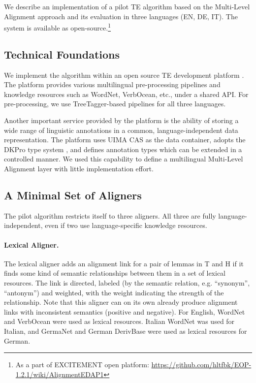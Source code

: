 \documentclass[11pt,letterpaper]{article}
\begin{document}
We describe an implementation of a pilot TE algorithm based on the
Multi-Level Alignment approach and its evaluation in three languages
(EN, DE, IT). The system is available as
open-source.\footnote{As a part of EXCITEMENT open platform: \url{https://github.com/hltfbk/EOP-1.2.1/wiki/AlignmentEDAP1}}


\subsection{Technical Foundations}  
\label{sec:techn-found}

We implement the algorithm within an open source TE development
platform \cite{EOP-arch}. The platform provides various multilingual
pre-processing pipelines and knowledge resources such as WordNet,
VerbOcean, etc., under a shared API. For pre-processing, we use
TreeTagger-based pipelines for all three languages.

Another important service provided by the platform is the
ability of storing a wide range of linguistic annotations in a common,
language-independent data representation. The platform uses UIMA CAS
\cite{d04:_uima} as the data container, adopts the DKPro type system
\cite{DKpro}, and defines annotation types which can be extended in a
controlled manner. We used this capability to define a multilingual
Multi-Level Alignment layer  %
with little implementation effort.

\subsection{A Minimal Set of Aligners}

The pilot algorithm restricts itself to three aligners.  All three are
fully language-independent, even if two use
language-specific knowledge resources.

\paragraph{Lexical Aligner.} The lexical aligner adds an alignment link
for a pair of lemmas in T and H if it finds some kind of semantic
relationships between them in a set of lexical resources. The link is
directed, labeled (by the semantic relation, e.g. ``synonym'',
``antonym'') and weighted, with the weight indicating the strength of
the relationship. Note that this aligner can on its own already
produce alignment links with inconsistent semantics (positive and
negative). For English, WordNet and VerbOcean were used as lexical
resources. Italian WordNet was used for Italian, and GermaNet and
German DerivBase \cite{Zeller:2013} were used as lexical resources for
German.
\end{document}
